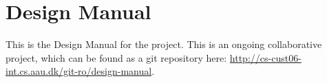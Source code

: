
\chapter{Design Manual}
\label{app:design_manual}

This is the Design Manual for the \giraf project. This is an ongoing collaborative project, which can be found as a git repository here: \url{http://cs-cust06-int.cs.aau.dk/git-ro/design-manual}.
% 